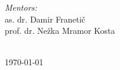 \documentclass[12pt]{article}
\begin{document}
\begin{titlepage}
\begin{minipage}{0.5\textwidth}
\begin{flushleft} \large
	\emph{Mentors:}\\
	as. dr. Damir Franetič\\ %
	prof. dr. Nežka Mramor Kosta \vspace{0.7 cm}\\ %
\end{flushleft}


\end{minipage}\\[2cm]


{\large \today}\\[2cm] %

\vfill %

\end{titlepage}

\tableofcontents
\newpage
\listoffigures
\newpage
\end{document}

